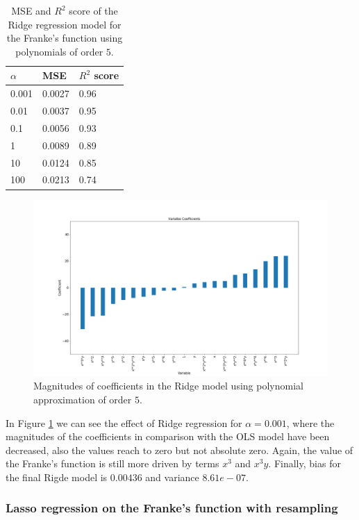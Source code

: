 \documentclass [11pt]{article}
\begin{document}
\begin{table}[H]
\centering
\begin{tabular}{lll}
\hline
$\alpha$ & MSE    & $R^{2}$ score \\ \hline
0.001     & 0.0027 & 0.96          \\
0.01      & 0.0037 & 0.95          \\
0.1       & 0.0056 & 0.93          \\
1         & 0.0089 & 0.89          \\
10        & 0.0124 & 0.85          \\
100       & 0.0213 & 0.74          \\ \hline
\end{tabular}
\caption{MSE and $R^{2}$ score of the Ridge regression model for the Franke's function using polynomials of order $5$.}
\label{tab:ridge5}
\end{table}

\begin{figure}[H]
\centering
\includegraphics[width=1\textwidth]{figures/coeffRidge.png}
        \caption{Magnitudes of coefficients in the Ridge model using polynomial approximation of order $5$.}
        \label{fig:coeffRidge}
\end{figure}
In Figure \ref{fig:coeffRidge} we can see the effect of Ridge regression for $\alpha=0.001$, where the magnitudes of the coefficients in comparison with the OLS model have been decreased, also the values reach to zero but not absolute zero. Again, the value of the Franke's function is still more driven by terms $x^{3}$ and $x^{3}y$. Finally, bias for the final Rigde model is $0.00436$ and variance $8.61e-07$.


\subsubsection{Lasso regression on the Franke's function  with resampling}
 
\end{document}
